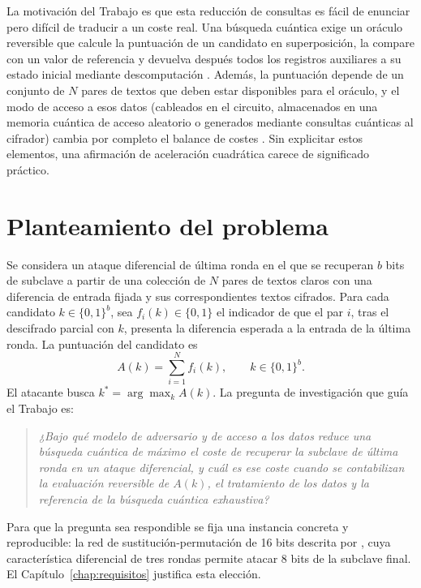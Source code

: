 La motivación del Trabajo es que esta reducción de consultas es fácil de enunciar pero difícil de traducir a un coste real. Una búsqueda cuántica exige un oráculo reversible que calcule la puntuación de un candidato en superposición, la compare con un valor de referencia y devuelva después todos los registros auxiliares a su estado inicial mediante descomputación \citep{bennett1973}. Además, la puntuación depende de un conjunto de \(N\) pares de textos que deben estar disponibles para el oráculo, y el modo de acceso a esos datos (cableados en el circuito, almacenados en una memoria cuántica de acceso aleatorio o generados mediante consultas cuánticas al cifrador) cambia por completo el balance de costes \citep{kaplan2016diff,jaques2023qram}. Sin explicitar estos elementos, una afirmación de aceleración cuadrática carece de significado práctico.

\section{Planteamiento del problema}
\label{sec:problema}

Se considera un ataque diferencial de última ronda en el que se recuperan \(b\) bits de subclave a partir de una colección de \(N\) pares de textos claros con una diferencia de entrada fijada y sus correspondientes textos cifrados. Para cada candidato \(k\in\{0,1\}^{b}\), sea \(f_i(k)\in\{0,1\}\) el indicador de que el par \(i\), tras el descifrado parcial con \(k\), presenta la diferencia esperada a la entrada de la última ronda. La puntuación del candidato es
\begin{equation}
 A(k)=\sum_{i=1}^{N} f_i(k), \qquad k\in\{0,1\}^{b}.
 \label{eq:score}
\end{equation}
El atacante busca \(k^\ast=\arg\max_k A(k)\). La pregunta de investigación que guía el Trabajo es:

\begin{quote}
\emph{¿Bajo qué modelo de adversario y de acceso a los datos reduce una búsqueda cuántica de máximo el coste de recuperar la subclave de última ronda en un ataque diferencial, y cuál es ese coste cuando se contabilizan la evaluación reversible de \(A(k)\), el tratamiento de los datos y la referencia de la búsqueda cuántica exhaustiva?}
\end{quote}

Para que la pregunta sea respondible se fija una instancia concreta y reproducible: la red de sustitución-permutación de 16 bits descrita por \citet{heys2002}, cuya característica diferencial de tres rondas permite atacar 8 bits de la subclave final. El Capítulo~\ref{chap:requisitos} justifica esta elección.

